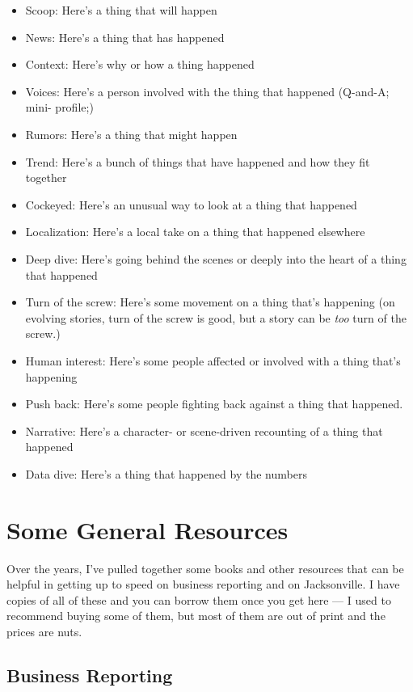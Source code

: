 \documentclass[
  12pt,
  american,
  letterpaperpaper,
  extrafontsizes,onecolumn,openright
  ]{memoir}
\providecommand{\tightlist}{%
  \setlength{\itemsep}{0pt}\setlength{\parskip}{0pt}}
\begin{document}
\begin{itemize}
\tightlist
\item
  Scoop: Here's a thing that will happen
\item
  News: Here's a thing that has happened
\item
  Context: Here's why or how a thing happened
\item
  Voices: Here's a person involved with the thing that happened (Q-and-A; mini- profile;)
\item
  Rumors: Here's a thing that might happen
\item
  Trend: Here's a bunch of things that have happened and how they fit together
\item
  Cockeyed: Here's an unusual way to look at a thing that happened
\item
  Localization: Here's a local take on a thing that happened elsewhere
\item
  Deep dive: Here's going behind the scenes or deeply into the heart of a thing that happened
\item
  Turn of the screw: Here's some movement on a thing that's happening (on evolving stories, turn of the screw is good, but a story can be \emph{too} turn of the screw.)
\item
  Human interest: Here's some people affected or involved with a thing that's happening
\item
  Push back: Here's some people fighting back against a thing that happened.
\item
  Narrative: Here's a character- or scene-driven recounting of a thing that happened
\item
  Data dive: Here's a thing that happened by the numbers
\end{itemize}

\hypertarget{some-general-resources}{%
\chapter{Some General Resources}\label{some-general-resources}}

Over the years, I've pulled together some books and other resources that can be helpful in getting up to speed on business reporting and on Jacksonville. I have copies of all of these and you can borrow them once you get here --- I used to recommend buying some of them, but most of them are out of print and the prices are nuts.

\hypertarget{business-reporting}{%
\section*{Business Reporting}\label{business-reporting}}
\end{document}
